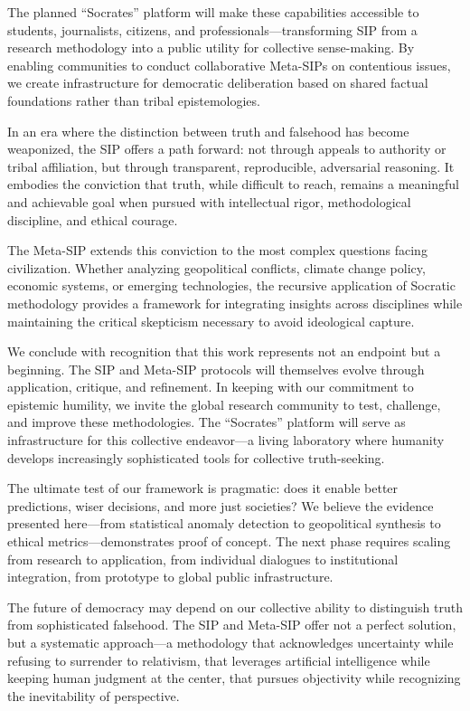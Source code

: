 \documentclass[11pt,a4paper]{article}
\begin{document}
The planned ``Socrates'' platform will make these capabilities accessible to students, journalists, citizens, and professionals---transforming SIP from a research methodology into a public utility for collective sense-making. By enabling communities to conduct collaborative Meta-SIPs on contentious issues, we create infrastructure for democratic deliberation based on shared factual foundations rather than tribal epistemologies.

In an era where the distinction between truth and falsehood has become weaponized, the SIP offers a path forward: not through appeals to authority or tribal affiliation, but through transparent, reproducible, adversarial reasoning. It embodies the conviction that truth, while difficult to reach, remains a meaningful and achievable goal when pursued with intellectual rigor, methodological discipline, and ethical courage.

The Meta-SIP extends this conviction to the most complex questions facing civilization. Whether analyzing geopolitical conflicts, climate change policy, economic systems, or emerging technologies, the recursive application of Socratic methodology provides a framework for integrating insights across disciplines while maintaining the critical skepticism necessary to avoid ideological capture.

We conclude with recognition that this work represents not an endpoint but a beginning. The SIP and Meta-SIP protocols will themselves evolve through application, critique, and refinement. In keeping with our commitment to epistemic humility, we invite the global research community to test, challenge, and improve these methodologies. The ``Socrates'' platform will serve as infrastructure for this collective endeavor---a living laboratory where humanity develops increasingly sophisticated tools for collective truth-seeking.

The ultimate test of our framework is pragmatic: does it enable better predictions, wiser decisions, and more just societies? We believe the evidence presented here---from statistical anomaly detection to geopolitical synthesis to ethical metrics---demonstrates proof of concept. The next phase requires scaling from research to application, from individual dialogues to institutional integration, from prototype to global public infrastructure.

The future of democracy may depend on our collective ability to distinguish truth from sophisticated falsehood. The SIP and Meta-SIP offer not a perfect solution, but a systematic approach---a methodology that acknowledges uncertainty while refusing to surrender to relativism, that leverages artificial intelligence while keeping human judgment at the center, that pursues objectivity while recognizing the inevitability of perspective.
\end{document}
